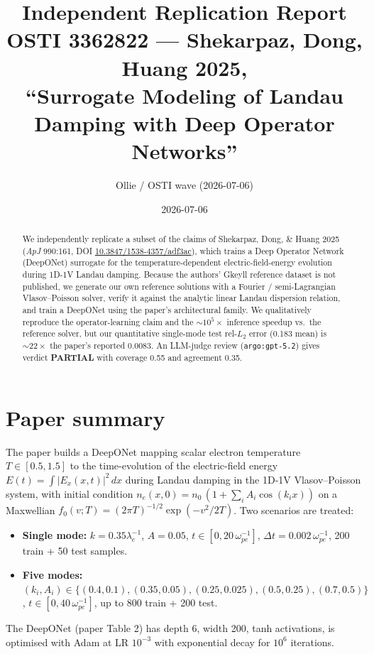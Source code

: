\documentclass[11pt]{article}
\title{Independent Replication Report\\
\large OSTI 3362822 — Shekarpaz, Dong, Huang 2025,\\
``Surrogate Modeling of Landau Damping with Deep Operator Networks''}
\author{Ollie / OSTI wave (2026-07-06)}
\date{2026-07-06}
\begin{document}
\maketitle

\begin{abstract}
We independently replicate a subset of the claims of Shekarpaz, Dong, \& Huang 2025
(\emph{ApJ} 990:161, DOI \href{https://doi.org/10.3847/1538-4357/adf3ac}{10.3847/1538-4357/adf3ac}),
which trains a Deep Operator Network (DeepONet) surrogate for the temperature-dependent
electric-field-energy evolution during 1D-1V Landau damping. Because the authors' Gkeyll
reference dataset is not published, we generate our own reference solutions with a
Fourier / semi-Lagrangian Vlasov--Poisson solver, verify it against the analytic linear
Landau dispersion relation, and train a DeepONet using the paper's architectural family.
We qualitatively reproduce the operator-learning claim and the $\sim\!10^{5}\times$ inference
speedup vs.\ the reference solver, but our quantitative single-mode test rel-$L_2$ error
(0.183 mean) is $\sim\!22\times$ the paper's reported 0.0083. An LLM-judge review
(\texttt{argo:gpt-5.2}) gives verdict \textbf{PARTIAL} with coverage 0.55 and agreement 0.35.
\end{abstract}

\section{Paper summary}
The paper builds a DeepONet mapping scalar electron temperature $T \in [0.5, 1.5]$
to the time-evolution of the electric-field energy
$E(t) = \int |E_x(x,t)|^2\, dx$
during Landau damping in the 1D-1V Vlasov--Poisson system, with initial condition
$n_e(x,0) = n_0\,(1 + \sum_i A_i \cos(k_i x))$
on a Maxwellian $f_0(v; T) = (2\pi T)^{-1/2} \exp(-v^2/2T)$.
Two scenarios are treated:
\begin{itemize}
    \item \textbf{Single mode:} $k = 0.35\lambda_e^{-1}$, $A = 0.05$, $t \in [0, 20\,\omega_{pe}^{-1}]$,
    $\Delta t = 0.002\,\omega_{pe}^{-1}$, 200 train + 50 test samples.
    \item \textbf{Five modes:} $(k_i, A_i) \in \{(0.4, 0.1), (0.35, 0.05), (0.25, 0.025), (0.5, 0.25), (0.7, 0.5)\}$,
    $t \in [0, 40\,\omega_{pe}^{-1}]$, up to 800 train + 200 test.
\end{itemize}
The DeepONet (paper Table 2) has depth 6, width 200, tanh activations, is optimised
with Adam at LR $10^{-3}$ with exponential decay for $10^6$ iterations.
\end{document}
